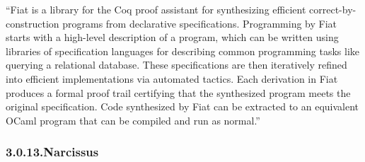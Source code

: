 \documentclass[12pt,twoside]{article}
\begin{document}
\noindent{}\textquotedblleft{}Fiat is a library for the Coq proof assistant for synthesizing
efficient correct-by-construction programs from declarative
specifications. Programming by Fiat starts with a high-level
description of a program, which can be written using libraries of
specification languages for describing common programming tasks like
querying a relational database. These specifications are then
iteratively refined into efficient implementations via automated
tactics. Each derivation in Fiat produces a formal proof trail
certifying that the synthesized program meets the original
specification. Code synthesized by Fiat can be extracted to an
equivalent OCaml program that can be compiled and run as normal.\textquotedblright{}%

\subsubsection{3.0.13.\hspace*{0.5em}Narcissus}\label{sec-narcissus}%
\end{document}
